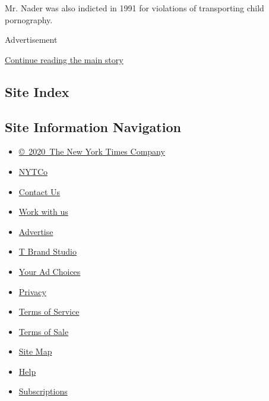 Mr. Nader was also indicted in 1991 for violations of transporting child
pornography.

Advertisement

\protect\hyperlink{after-bottom}{Continue reading the main story}

\hypertarget{site-index}{%
\subsection{Site Index}\label{site-index}}

\hypertarget{site-information-navigation}{%
\subsection{Site Information
Navigation}\label{site-information-navigation}}

\begin{itemize}
\tightlist
\item
  \href{https://help.nytimes.com/hc/en-us/articles/115014792127-Copyright-notice}{©~2020~The
  New York Times Company}
\end{itemize}

\begin{itemize}
\tightlist
\item
  \href{https://www.nytco.com/}{NYTCo}
\item
  \href{https://help.nytimes.com/hc/en-us/articles/115015385887-Contact-Us}{Contact
  Us}
\item
  \href{https://www.nytco.com/careers/}{Work with us}
\item
  \href{https://nytmediakit.com/}{Advertise}
\item
  \href{http://www.tbrandstudio.com/}{T Brand Studio}
\item
  \href{https://www.nytimes.com/privacy/cookie-policy\#how-do-i-manage-trackers}{Your
  Ad Choices}
\item
  \href{https://www.nytimes.com/privacy}{Privacy}
\item
  \href{https://help.nytimes.com/hc/en-us/articles/115014893428-Terms-of-service}{Terms
  of Service}
\item
  \href{https://help.nytimes.com/hc/en-us/articles/115014893968-Terms-of-sale}{Terms
  of Sale}
\item
  \href{https://spiderbites.nytimes.com}{Site Map}
\item
  \href{https://help.nytimes.com/hc/en-us}{Help}
\item
  \href{https://www.nytimes.com/subscription?campaignId=37WXW}{Subscriptions}
\end{itemize}

